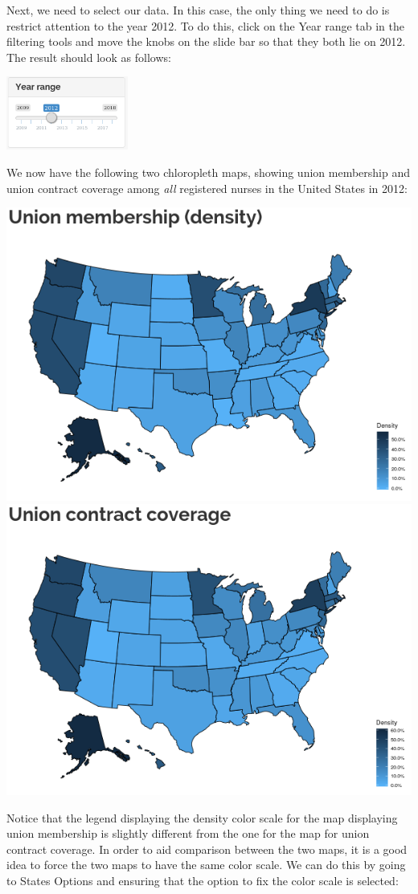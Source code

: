 \documentclass[letterpaper,12pt]{article}
\begin{document}
\begin{enumerate}
  Next, we need to select our data. In this case, the only thing we
  need to do is restrict attention to the year 2012. To do this, click
  on the Year range tab in the filtering tools and move the knobs on
  the slide bar so that they both lie on 2012. The result should look
  as follows:
  \begin{center}
    \includegraphics[width=0.3\textwidth]{images/maps_ex2/year_selection.png}
  \end{center}
  We now have the following two chloropleth maps, showing union
  membership and union contract coverage among \emph{all} registered
  nurses in the United States in 2012:
  \begin{center}
    \includegraphics[width=0.49\linewidth]{images/maps_ex2/membership_map.png}
    \includegraphics[width=0.49\linewidth]{images/maps_ex2/coverage_map.png}
  \end{center}
  Notice that the legend displaying the density color scale for the
  map displaying union membership is slightly different from the one
  for the map for union contract coverage. In order to aid comparison
  between the two maps, it is a good idea to force the two maps to
  have the same color scale. We can do this by going to States
  \textrightarrow{} Options and ensuring that the option to fix the
  color scale is selected:

\end{enumerate}
\end{document}
